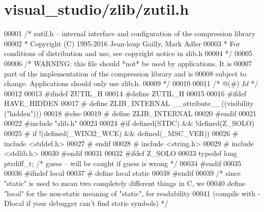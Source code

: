 \hypertarget{visual__studio_2zlib_2zutil_8h_source}{}\section{visual\+\_\+studio/zlib/zutil.h}
\label{visual__studio_2zlib_2zutil_8h_source}

\begin{DoxyCode}
00001 \textcolor{comment}{/* zutil.h -- internal interface and configuration of the compression library}
00002 \textcolor{comment}{ * Copyright (C) 1995-2016 Jean-loup Gailly, Mark Adler}
00003 \textcolor{comment}{ * For conditions of distribution and use, see copyright notice in zlib.h}
00004 \textcolor{comment}{ */}
00005 
00006 \textcolor{comment}{/* WARNING: this file should *not* be used by applications. It is}
00007 \textcolor{comment}{   part of the implementation of the compression library and is}
00008 \textcolor{comment}{   subject to change. Applications should only use zlib.h.}
00009 \textcolor{comment}{ */}
00010 
00011 \textcolor{comment}{/* @(#) $Id$ */}
00012 
00013 \textcolor{preprocessor}{#ifndef ZUTIL\_H}
00014 \textcolor{preprocessor}{#define ZUTIL\_H}
00015 
00016 \textcolor{preprocessor}{#ifdef HAVE\_HIDDEN}
00017 \textcolor{preprocessor}{#  define ZLIB\_INTERNAL \_\_attribute\_\_((visibility ("hidden")))}
00018 \textcolor{preprocessor}{#else}
00019 \textcolor{preprocessor}{#  define ZLIB\_INTERNAL}
00020 \textcolor{preprocessor}{#endif}
00021 
00022 \textcolor{preprocessor}{#include "zlib.h"}
00023 
00024 \textcolor{preprocessor}{#if defined(STDC) && !defined(Z\_SOLO)}
00025 \textcolor{preprocessor}{#  if !(defined(\_WIN32\_WCE) && defined(\_MSC\_VER))}
00026 \textcolor{preprocessor}{#    include <stddef.h>}
00027 \textcolor{preprocessor}{#  endif}
00028 \textcolor{preprocessor}{#  include <string.h>}
00029 \textcolor{preprocessor}{#  include <stdlib.h>}
00030 \textcolor{preprocessor}{#endif}
00031 
00032 \textcolor{preprocessor}{#ifdef Z\_SOLO}
00033    \textcolor{keyword}{typedef} \textcolor{keywordtype}{long} ptrdiff\_t;  \textcolor{comment}{/* guess -- will be caught if guess is wrong */}
00034 \textcolor{preprocessor}{#endif}
00035 
00036 \textcolor{preprocessor}{#ifndef local}
00037 \textcolor{preprocessor}{#  define local static}
00038 \textcolor{preprocessor}{#endif}
00039 \textcolor{comment}{/* since "static" is used to mean two completely different things in C, we}
00040 \textcolor{comment}{   define "local" for the non-static meaning of "static", for readability}
00041 \textcolor{comment}{   (compile with -Dlocal if your debugger can't find static symbols) */}

\end{DoxyCode}
